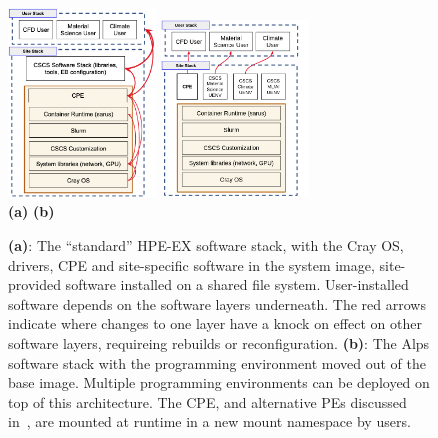 \begin{figure}[htp!]
    \begin{center}
        \includegraphics[width=0.35\textwidth]{./images/stack-old.png}
        \hspace{2.5cm}
        \includegraphics[width=0.35\textwidth]{./images/stack-new.png}
        \\
        \textbf{(a)} \hspace{9cm} \textbf{(b)}\\
    \end{center}
    \caption{
        \textbf{(a)}:
        The ``standard'' HPE-EX software stack, with the Cray OS, drivers, CPE and site-specific software in the system image, site-provided software installed on a shared file system. 
        User-installed software depends on the software layers underneath.
        The red arrows indicate where changes to one layer have a knock on effect on other software layers, requireing rebuilds or reconfiguration.\newline
        \textbf{(b)}:
        The Alps software stack with the programming environment moved out of the base image.
        Multiple programming environments can be deployed on top of this architecture. The CPE, and alternative PEs discussed in~, are mounted at runtime in a new mount namespace by users.
    }
    \label{fig:stacks}
\end{figure}

